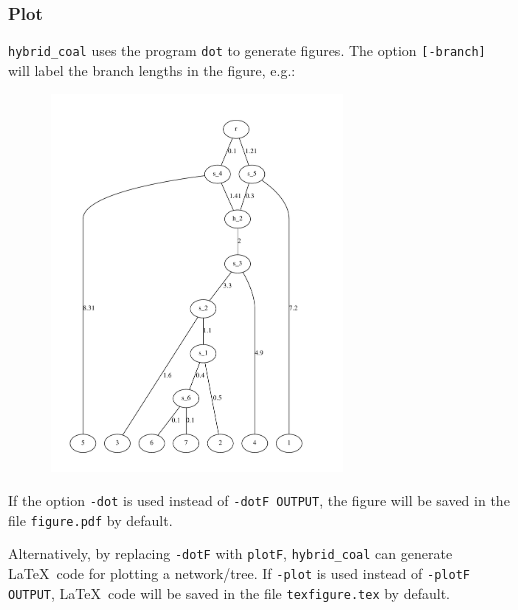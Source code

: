 \subsubsection{Plot}
{\tt hybrid\_coal} uses the program {\tt dot} to generate figures. The option {\tt [-branch]} will label the branch lengths in the figure, e.g.:
\begin{center}
\includegraphics[width=10cm,height=10cm]{branch.pdf}
\end{center}
If the option {\tt -dot} is used instead of {\tt -dotF OUTPUT}, the figure will be saved in the file {\tt figure.pdf} by default.

Alternatively, by replacing {\tt -dotF} with {\tt plotF}, {\tt hybrid\_coal} can generate \LaTeX \ code for plotting a network/tree.
If {\tt -plot} is used instead of {\tt -plotF OUTPUT}, \LaTeX \ code will be saved in the file {\tt texfigure.tex} by default.


